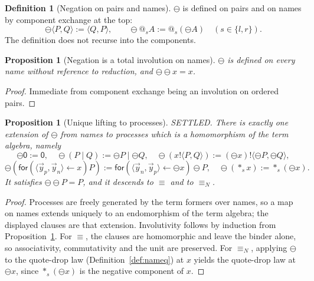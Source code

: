 \documentclass[11pt]{article}
\makeatletter
\newtheorem{proposition}[theorem]{Proposition}
\theoremstyle{definition}
\newtheorem{definition}[theorem]{Definition}
\theoremstyle{remark}
\newcommand{\pzero}{\mathsf{0}}
\newcommand{\quo}[1]{\ensuremath{@_{#1}}}
\newcommand{\drp}[1]{\ensuremath{*_{#1}}}
\newcommand{\dip}[2]{\ensuremath{\langle #1 , #2 \rangle}}
\newcommand{\negop}{\ensuremath{\ominus}}
\newcommand{\scong}{\ensuremath{\equiv}}
\newcommand{\nameq}{\ensuremath{\equiv_{N}}}
\makeatother
\begin{document}
\begin{definition}[Negation on pairs and names]
\label{def:neg}
$\negop$ is defined on pairs and on names by component exchange at the top:
\[
  \negop\dip{P}{Q} := \dip{Q}{P}, \qquad
  \negop\quo{s}A := \quo{s}(\negop A) \quad (s \in \{l,r\}).
\]
The definition does not recurse into the components.
\end{definition}

\begin{proposition}[Negation is a total involution on names]
\label{prop:involution}
$\negop$ is defined on every name without reference to reduction, and
$\negop\negop x = x$.
\end{proposition}

\begin{proof}
Immediate from component exchange being an involution on ordered pairs.
\end{proof}

\begin{proposition}[Unique lifting to processes]
\label{prop:lift}
SETTLED. There is exactly one extension of $\negop$ from names to processes
which is a homomorphism of the term algebra, namely
\[
  \negop\pzero := \pzero, \quad
  \negop(P \mid Q) := \negop P \mid \negop Q, \quad
  \negop(x!\dip{P}{Q}) := (\negop x)!\dip{\negop P}{\negop Q},
\]
\[
  \negop(\mathsf{for}(\dip{\vec{y}_p}{\vec{y}_n} \leftarrow x)P) := \mathsf{for}(\dip{\vec{y}_n}{\vec{y}_p} \leftarrow \negop x)\negop P,
  \quad
  \negop(\drp{s}x) := \drp{s}(\negop x).
\]
It satisfies $\negop\negop P = P$, and it descends to $\scong$ and to $\nameq$.
\end{proposition}

\begin{proof}
Processes are freely generated by the term formers over names, so a map on names
extends uniquely to an endomorphism of the term algebra; the displayed clauses
are that extension. Involutivity follows by induction from
Proposition~\ref{prop:involution}. For $\scong$, the clauses are homomorphic and
leave the binder alone, so associativity, commutativity and the unit are
preserved. For $\nameq$, applying $\negop$ to the quote-drop law
(Definition~\ref{def:nameq}) at $x$ yields the quote-drop law at $\negop x$,
since $\drp{s}(\negop x)$ is the negative component of $x$.
\end{proof}
\end{document}
